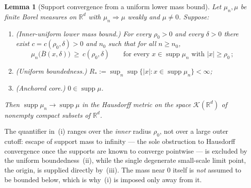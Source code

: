 \documentclass[11pt]{article}
\newtheorem{lemma}[theorem]{Lemma}
\theoremstyle{definition}
\theoremstyle{remark}
\newcommand{\R}{\mathbb{R}}
\newcommand{\supp}{\operatorname{supp}}
\numberwithin{equation}{section}
\theoremstyle{plain}
\theoremstyle{definition}
\theoremstyle{remark}
\theoremstyle{plain}
\begin{document}
\begin{lemma}[Support convergence from a uniform lower mass bound]
\label{lem:suppconv}
Let $\mu_n,\mu$ be finite Borel measures on $\R^d$ with
$\mu_n\Rightarrow\mu$ weakly and $\mu\neq0$. Suppose:
\begin{enumerate}[label=\textup{(\roman*)},nosep,leftmargin=2.2em]
\item \emph{(Inner-uniform lower mass bound.)} For every $\rho_0>0$ and
every $\delta>0$ there exist $c=c(\rho_0,\delta)>0$ and $n_0$ such that for
all $n\ge n_0$,
\begin{equation}\label{eq:LMBdet}
\mu_n\bigl(\overline B(x,\delta)\bigr)\ \ge\ c(\rho_0,\delta)
\qquad\text{for every }x\in\supp\mu_n\text{ with }|x|\ge\rho_0\,;
\end{equation}
\item \emph{(Uniform boundedness.)} $R_\ast:=\sup_n\sup\{|x|:x\in\supp\mu_n\}<\infty$;
\item \emph{(Anchored core.)} $0\in\supp\mu$.
\end{enumerate}
Then $\supp\mu_n\to\supp\mu$ in the Hausdorff metric on the space
$\mathcal K(\R^d)$ of nonempty compact subsets of $\R^d$.
\end{lemma}

The quantifier in~(i) ranges over the \emph{inner} radius $\rho_0$, not
over a large outer cutoff: escape of support mass to infinity --- the sole
obstruction to Hausdorff convergence once the supports are known to converge
pointwise --- is excluded by
the uniform boundedness~(ii), while the single degenerate small-scale limit
point, the origin, is supplied directly by~(iii). The mass near $0$ itself is
\emph{not} assumed to be bounded below, which is why~(i) is imposed
only away from it.
\end{document}
